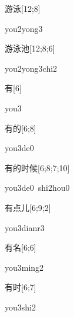 \begin{verbete}{游泳}[12;8]
\begin{pronuncia}{you2yong3}
\end{pronuncia}
\end{verbete}

\begin{verbete}{游泳池}[12;8;6]
\begin{pronuncia}{you2yong3chi2}
\end{pronuncia}
\end{verbete}

\begin{verbete}[you3]{有}[6]
\begin{pronuncia}{you3}
\end{pronuncia}
\end{verbete}

\begin{verbete}[you3de0]{有的}[6;8]
\begin{pronuncia}{you3de0}
\end{pronuncia}
\end{verbete}

\begin{verbete}{有的时候}[6;8;7;10]
\begin{pronuncia}[\\]{you3de0\ shi2hou0}
\end{pronuncia}
\end{verbete}

\begin{verbete}{有点儿}[6;9;2]
\begin{pronuncia}{you3dianr3}
\end{pronuncia}
\end{verbete}

\begin{verbete}{有名}[6;6]
\begin{pronuncia}{you3ming2}
\end{pronuncia}
\end{verbete}

\begin{verbete}{有时}[6;7]
\begin{pronuncia}{you3shi2}
\end{pronuncia}
\end{verbete}

